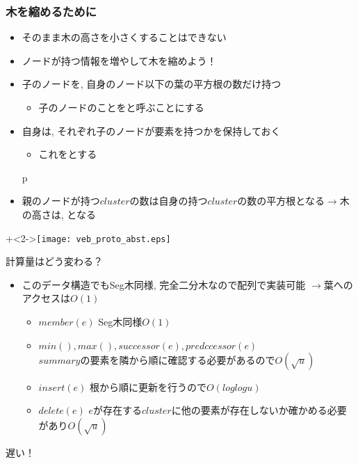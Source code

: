 \documentclass[dvipdfmx,12pt,notheorems]{beamer}
\theoremstyle{definition}
\begin{document}
\begin{frame}\frametitle{木を縮めるために}
\begin{itemize}
\item そのまま木の高さを小さくすることはできない
\pause
\item ノードが持つ情報を増やして木を縮めよう！
\end{itemize}
\begin{itemize}
\item 子のノードを, 自身のノード以下の葉の平方根の数だけ持つ
\begin{itemize}\item 子のノードのことをと呼ぶことにする\end{itemize}
\item 自身は, それぞれ子のノードが要素を持つかを保持しておく
\begin{itemize} \item これをとする\end{itemize}p
\item 親のノードが持つ$cluster$の数は自身の持つ$cluster$の数の平方根となる$\rightarrow$木の高さは, となる
\end{itemize}
\onslide+<2->{\texttt{[image: veb\_proto\_abst.eps]}}
\end{frame}

\begin{frame}{計算量はどう変わる？}
\begin{itemize}
\item このデータ構造でもSeg木同様, 完全二分木なので配列で実装可能 $\rightarrow$葉へのアクセスは$O(1)$
\begin{itemize}
	\item $member(e)$ \; Seg木同様$O(1)$
	\item $min(), max(), successor(e), predccessor(e)$ \\
	\hspace{3ex} $summary$の要素を隣から順に確認する必要があるので\alert{$O(\sqrt{u})$} 
	\item $insert(e)$ \; 根から順に更新を行うので$O(loglogu)$ \\
	\item $delete(e)$ \; $e$が存在する$cluster$に他の要素が存在しないか確かめる必要があり\alert{$O(\sqrt{u})$}
\end{itemize}
\end{itemize}
\begin{center}
\pause
\LARGE{\alert{遅い！}}
\end{center}
\end{frame}
\end{document}
